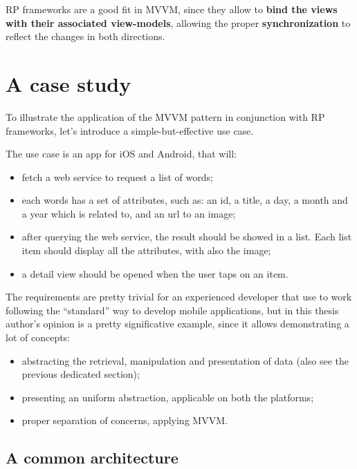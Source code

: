 RP frameworks are a good fit in MVVM, since they allow to \textbf{bind
the views with their associated view-models}, allowing the proper
\textbf{synchronization} to reflect the changes in both directions.

\section{A case study}\label{a-case-study}

To illustrate the application of the MVVM pattern in conjunction with RP
frameworks, let's introduce a simple-but-effective use case.

The use case is an app for iOS and Android, that will:

\begin{itemize}
\itemsep1pt\parskip0pt
\item
  fetch a web service to request a list of words;
\item
  each words has a set of attributes, such as: an id, a title, a day, a
  month and a year which is related to, and an url to an image;
\item
  after querying the web service, the result should be showed in a list.
  Each list item should display all the attributes, with also the image;
\item
  a detail view should be opened when the user taps on an item.
\end{itemize}

The requirements are pretty trivial for an experienced developer that
use to work following the ``standard'' way to develop mobile
applications, but in this thesis author's opinion is a pretty
significative example, since it allows demonstrating a lot of concepts:

\begin{itemize}
\itemsep1pt\parskip0pt
\item
  abstracting the retrieval, manipulation and presentation of data (also
  see the previous dedicated section);
\item
  presenting an uniform abstraction, applicable on both the platforms;
\item
  proper separation of concerns, applying MVVM.
\end{itemize}


\subsection{A common architecture}\label{a-common-architecture}

